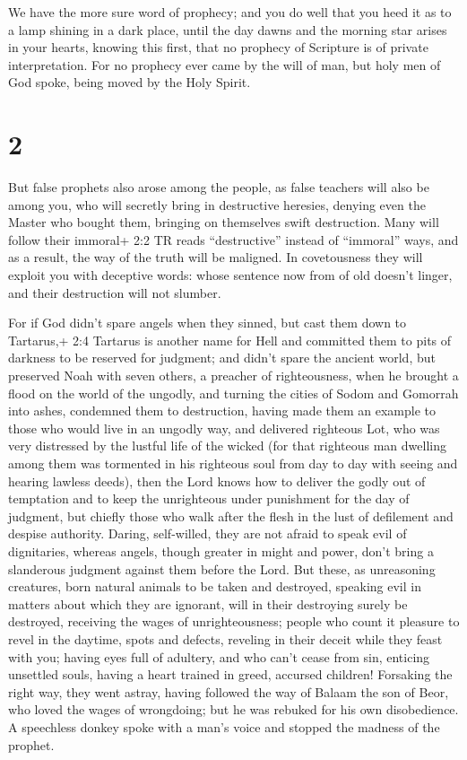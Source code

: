  We have the more sure word of prophecy; and you do well
that you heed it as to a lamp shining in a dark place, until the day
dawns and the morning star arises in your hearts,  knowing
this first, that no prophecy of Scripture is of private interpretation.
 For no prophecy ever came by the will of man, but holy men
of God spoke, being moved by the Holy Spirit.

\hypertarget{section-1}{%
\section{2}\label{section-1}}

 But false prophets also arose among the people, as false
teachers will also be among you, who will secretly bring in destructive
heresies, denying even the Master who bought them, bringing on
themselves swift destruction.  Many will follow their
immoral+ 2:2 TR reads ``destructive'' instead of ``immoral'' ways, and
as a result, the way of the truth will be maligned.  In
covetousness they will exploit you with deceptive words: whose sentence
now from of old doesn't linger, and their destruction will not slumber.

 For if God didn't spare angels when they sinned, but cast
them down to Tartarus,+ 2:4 Tartarus is another name for Hell and
committed them to pits of darkness to be reserved for judgment;
 and didn't spare the ancient world, but preserved Noah with
seven others, a preacher of righteousness, when he brought a flood on
the world of the ungodly,  and turning the cities of Sodom
and Gomorrah into ashes, condemned them to destruction, having made them
an example to those who would live in an ungodly way,  and
delivered righteous Lot, who was very distressed by the lustful life of
the wicked  (for that righteous man dwelling among them was
tormented in his righteous soul from day to day with seeing and hearing
lawless deeds),  then the Lord knows how to deliver the
godly out of temptation and to keep the unrighteous under punishment for
the day of judgment,  but chiefly those who walk after the
flesh in the lust of defilement and despise authority. Daring,
self-willed, they are not afraid to speak evil of dignitaries,
 whereas angels, though greater in might and power, don't
bring a slanderous judgment against them before the Lord. 
But these, as unreasoning creatures, born natural animals to be taken
and destroyed, speaking evil in matters about which they are ignorant,
will in their destroying surely be destroyed,  receiving
the wages of unrighteousness; people who count it pleasure to revel in
the daytime, spots and defects, reveling in their deceit while they
feast with you;  having eyes full of adultery, and who
can't cease from sin, enticing unsettled souls, having a heart trained
in greed, accursed children!  Forsaking the right way, they
went astray, having followed the way of Balaam the son of Beor, who
loved the wages of wrongdoing;  but he was rebuked for his
own disobedience. A speechless donkey spoke with a man's voice and
stopped the madness of the prophet.

